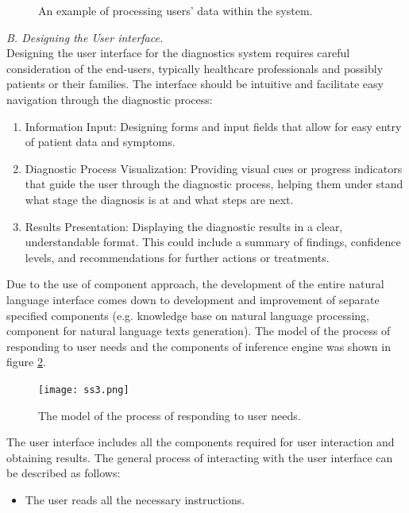 \documentclass[10pt, a4paper]{article}
\begin{document}
\begin{SCn}
\begin{small}
\begin{multicols}{2}
\begin{figure}[H]
 \caption{\small An example of processing users’ data within the system.}
 \label{fig:ss2.png} 
 \end{figure}
\vspace{0.3cm}
\textit {B. Designing the User interface.}\\
Designing the user interface for the diagnostics system
requires careful consideration of the end-users, typically
healthcare professionals and possibly patients or their
families. The interface should be intuitive and facilitate
easy navigation through the diagnostic process:
\vspace{-0.2cm}
\begin{enumerate}
\item [1)] Information Input: Designing forms and input fields
that allow for easy entry of patient data and symptoms.
\vspace{-0.2cm}
\item [2)] Diagnostic Process Visualization: Providing visual
cues or progress indicators that guide the user
through the diagnostic process, helping them under
stand what stage the diagnosis is at and what steps
are next.
\vspace{-0.2cm}
\item [3)] Results Presentation: Displaying the diagnostic results in a clear, understandable format. This could
include a summary of findings, confidence levels,
and recommendations for further actions or treatments.
\end{enumerate}
Due to the use of component approach, the development of the entire natural language interface comes down
to development and improvement of separate specified
components (e.g. knowledge base on natural language
processing, component for natural language texts generation). The model of the process of responding to user
needs and the components of inference engine was shown
in figure \ref{fig:ss3.png}.\\
\vspace{-0.45cm}
\setcounter{figure}{3}
\begin{figure}[H]
\centering
 \texttt{[image: ss3.png]}
 \caption{\small The model of the process of responding to user needs.}
 \label{fig:ss3.png}
\end{figure}
The user interface includes all the components required for user interaction and obtaining results. The
general process of interacting with the user interface can
be described as follows:
\begin{itemize}
\item  The user reads all the necessary instructions.

\end{itemize}
\end{multicols}
\end{small}
\end{SCn}
\end{document}
